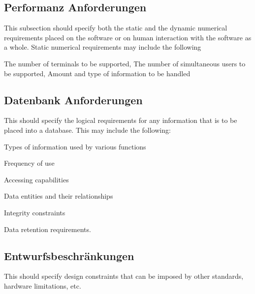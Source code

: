 {		%
	
	\subsection{Performanz Anforderungen}
		This subsection should specify both the static and the dynamic numerical requirements placed on the software or on human interaction with the software as a whole. Static numerical requirements may include the following
		
		The number of terminals to be supported, The number of simultaneous users to be supported, Amount and type of information to be handled
		
	\subsection{Datenbank Anforderungen}
		This should specify the logical requirements for any information that is to be placed into a database. This may include the following:
		
		Types of information used by various functions
		
		Frequency of use
		
		Accessing capabilities
		
		Data entities and their relationships
		
		Integrity constraints
		
		Data retention requirements.
	
	\subsection{Entwurfsbeschränkungen}
		This should specify design constraints that can be imposed by other standards, hardware limitations, etc.
		
}
